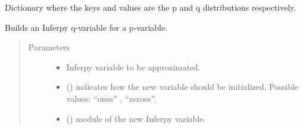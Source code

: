 \documentclass[letterpaper,10pt,english]{sphinxmanual}
\begin{document}
\begin{fulllineitems}
\begin{fulllineitems}
\begin{quote}
\begin{description}
\begin{itemize}
\end{itemize}

\end{description}\end{quote}

\end{fulllineitems}


\begin{fulllineitems}
\label{\detokenize{modules/inferpy.inferences:inferpy.inferences.qmodel.Qmodel.compatible_var}}
\end{fulllineitems}


\begin{fulllineitems}
\label{\detokenize{modules/inferpy.inferences:inferpy.inferences.qmodel.Qmodel.dict}}
Dictionary where the keys and values are the p and q distributions respectively.

\end{fulllineitems}


\begin{fulllineitems}
\label{\detokenize{modules/inferpy.inferences:inferpy.inferences.qmodel.Qmodel.new_qvar}}
Builds an Inferpy q-variable for a p-variable.
\begin{quote}\begin{description}
\item[{Parameters}] \leavevmode\begin{itemize}
\item {} 
 \textendash{} Inferpy variable to be approximated.

\item {} 
 () \textendash{} indicates how the new variable should be initialized. Possible values: “ones” , “zeroes”.

\item {} 
 () \textendash{} module of the new Inferpy variable.


\end{itemize}
\end{description}
\end{quote}
\end{fulllineitems}
\end{fulllineitems}
\end{document}
